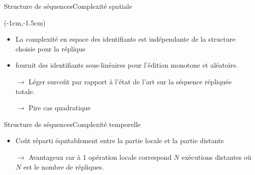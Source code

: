 \begin{frame}{Structure de séquences}{Complexité spatiale}
  \vspace{1cm}
  
  \begin{textblock*}{\textwidth}(-1cm,-1.5cm) 
    \begin{table}[H]
      
    \end{table}
  \end{textblock*}
  
  \vspace{2cm}
  
  \begin{itemize}
  \item La complexité en espace des identifiants est indépendante de la
    structure choisie pour la réplique
  \item \LSEQ fournit des identifiants sous-linéaires pour l'édition monotone
    et aléatoire.
  \end{itemize}
  
  \begin{itemize}
  \item [$\rightarrow$] Léger surcoût par rapport à l'état de l'art sur la
    séquence répliquée totale.
  \item [$\rightarrow$] Pire cas quadratique
  \end{itemize}
  
\end{frame}


\begin{frame}{Structure de séquences}{Complexité temporelle}

  \begin{center}
    
  \end{center}
  
  \vspace{0.5cm}
  
  \begin{itemize}
  \item Coût réparti équitablement entre la partie locale et la partie distante
  \item [$\rightarrow$] Avantageux car à 1 opération locale correspond $N$
    exécutions distantes où $N$ est le nombre de répliques.
  \end{itemize}
  
\end{frame}

